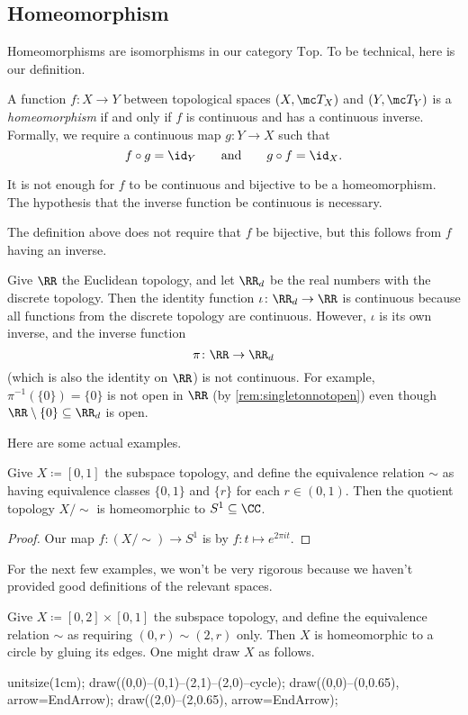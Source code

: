 \documentclass[../notes.tex]{subfiles}
\begin{document}
\subsection{Homeomorphism}
Homeomorphisms are isomorphisms in our category $\mathrm{Top}$. To be technical, here is our definition.
\begin{definition}[Homeomorphism]
	A function $f\colon X\to Y$ between topological spaces $(X,\mc T_X)$ and $(Y,\mc T_Y)$ is a \textit{homeomorphism} if and only if $f$ is continuous and has a continuous inverse. Formally, we require a continuous map $g\colon Y\to X$ such that
	\[f\circ g={\id_Y}\qquad\text{and}\qquad g\circ f={\id_X}.\]
\end{definition}
\begin{warn}
	It is not enough for $f$ to be continuous and bijective to be a homeomorphism. The hypothesis that the inverse function be continuous is necessary.
\end{warn}
\begin{remark}
	The definition above does not require that $f$ be bijective, but this follows from $f$ having an inverse.
\end{remark}
\begin{example}
	Give $\RR$ the Euclidean topology, and let $\RR_d$ be the real numbers with the discrete topology. Then the identity function $\iota\colon\RR_d\to\RR$ is continuous because all functions from the discrete topology are continuous. However, $\iota$ is its own inverse, and the inverse function
	\[\pi\colon\RR\to\RR_d\]
	(which is also the identity on $\RR$) is not continuous. For example, $\pi^{-1}(\{0\})=\{0\}$ is not open in $\RR$ (by \autoref{rem:singletonnotopen}) even though $\RR\setminus\{0\}\subseteq\RR_d$ is open.
\end{example}
Here are some actual examples.
\begin{exe}
	Give $X\coloneqq[0,1]$ the subspace topology, and define the equivalence relation $\sim$ as having equivalence classes $\{0,1\}$ and $\{r\}$ for each $r\in(0,1)$. Then the quotient topology $X/{\sim}$ is homeomorphic to $S^1\subseteq\CC$.
\end{exe}
\begin{proof}
	Our map $f\colon(X/{\sim})\to S^1$ is by $f\colon t\mapsto e^{2\pi it}$.
\end{proof}
For the next few examples, we won't be very rigorous because we haven't provided good definitions of the relevant spaces.
\begin{ex} \label{ex:cylinder}
	Give $X\coloneqq[0,2]\times[0,1]$ the subspace topology, and define the equivalence relation $\sim$ as requiring $(0,r)\sim(2,r)$ only. Then $X$ is homeomorphic to a circle by gluing its edges. One might draw $X$ as follows.
	\begin{center}
		\begin{asy}
			unitsize(1cm);
			draw((0,0)--(0,1)--(2,1)--(2,0)--cycle);
			draw((0,0)--(0,0.65), arrow=EndArrow);
			draw((2,0)--(2,0.65), arrow=EndArrow);
		\end{asy}
	\end{center}
\end{ex}
\end{document}
